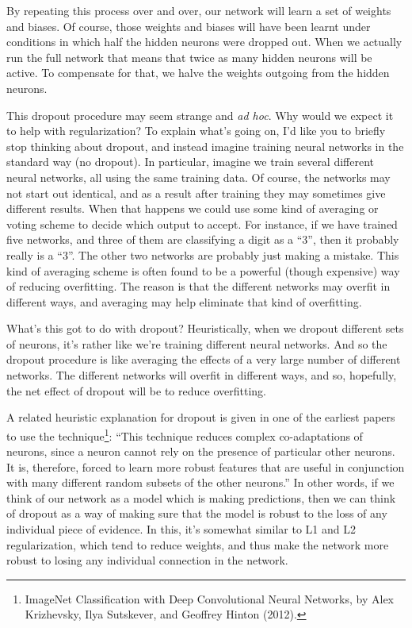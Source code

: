 \documentclass[a4paper,twoside,10pt]{book}
\begin{document}
By repeating this process over and over, our network will learn a set of weights and biases. Of course, those weights and biases will have been learnt under conditions in which half the hidden neurons were dropped out. When we actually run the full network that means that twice as many hidden neurons will be active. To compensate for that, we halve the weights outgoing from the hidden neurons.

This dropout procedure may seem strange and \textit{ad hoc}. Why would we expect it to help with regularization? To explain what's going on, I'd like you to briefly stop thinking about dropout, and instead imagine training neural networks in the standard way (no dropout). In particular, imagine we train several different neural networks, all using the same training data. Of course, the networks may not start out identical, and as a result after training they may sometimes give different results. When that happens we could use some kind of averaging or voting scheme to decide which output to accept. For instance, if we have trained five networks, and three of them are classifying a digit as a ``3'', then it probably really is a ``3''. The other two networks are probably just making a mistake. This kind of averaging scheme is often found to be a powerful (though expensive) way of reducing overfitting. The reason is that the different networks may overfit in different ways, and averaging may help eliminate that kind of overfitting.

What's this got to do with dropout? Heuristically, when we dropout different sets of neurons, it's rather like we're training different neural networks. And so the dropout procedure is like averaging the effects of a very large number of different networks. The different networks will overfit in different ways, and so, hopefully, the net effect of dropout will be to reduce overfitting.


A related heuristic explanation for dropout is given in one of the earliest papers to use the technique\footnote{ImageNet Classification with Deep Convolutional Neural Networks, by Alex Krizhevsky, Ilya Sutskever, and Geoffrey Hinton (2012).}: ``This technique reduces complex co-adaptations of neurons, since a neuron cannot rely on the presence of particular other neurons. It is, therefore, forced to learn more robust features that are useful in conjunction with many different random subsets of the other neurons.'' In other words, if we think of our network as a model which is making predictions, then we can think of dropout as a way of making sure that the model is robust to the loss of any individual piece of evidence. In this, it's somewhat similar to L1 and L2 regularization, which tend to reduce weights, and thus make the network more robust to losing any individual connection in the network.
\end{document}
